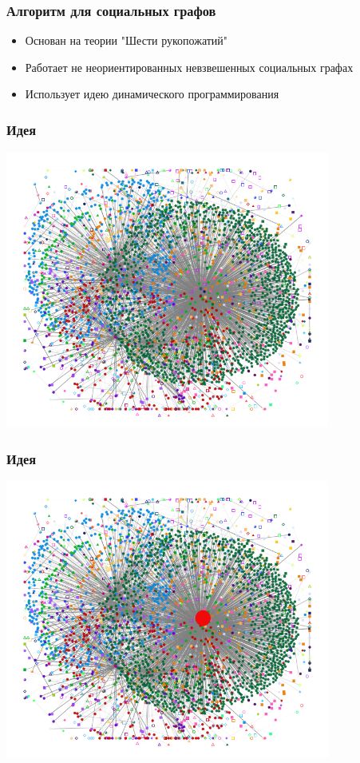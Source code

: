 \documentclass[10pt, compress]{beamer}
\begin{document}
\begin{frame}[fragile]
  \frametitle{Алгоритм для социальных графов}
  \begin{itemize}
    \item Основан на теории "Шести рукопожатий"
    \item Работает не неориентированных невзвешенных социальных графах
    \item Использует идею динамического программирования
  \end{itemize}
\end{frame}

\begin{frame}[fragile]
  \frametitle{Идея}
    {\vspace{-2em}\begin{center}\includegraphics[width=0.8\textwidth,height=0.8\textheight]{images/floyd_social_1.png}\end{center}}

\end{frame}

\begin{frame}[fragile]
  \frametitle{Идея}
    {\vspace{-2em}\begin{center}\includegraphics[width=0.8\textwidth,height=0.8\textheight]{images/floyd_social_2.png}\end{center}}

\end{frame}
\end{document}

